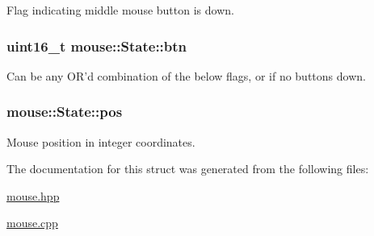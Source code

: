 Flag indicating middle mouse button is down. 

\hypertarget{structmouse_1_1_state_a27fa449d068a08894434d44c160f0f00}{
\subsubsection[{btn}]{\setlength{\rightskip}{0pt plus 5cm}uint16\-\_\-t {\bf mouse\-::\-State\-::btn}}}\label{structmouse_1_1_state_a27fa449d068a08894434d44c160f0f00}


Can be any {\ttfamily O\-R}'d combination of the below flags, or {} if no buttons down. 

\hypertarget{structmouse_1_1_state_ae4c6bba70a3c69992f7624bfc908b2c0}{
\subsubsection[{pos}]{ {\bf mouse\-::\-State\-::pos}}}\label{structmouse_1_1_state_ae4c6bba70a3c69992f7624bfc908b2c0}


Mouse position in integer coordinates. 



The documentation for this struct was generated from the following files\-:\begin{DoxyCompactItemize}
\item 
\hyperlink{mouse_8hpp}{mouse.\-hpp}\item 
\hyperlink{mouse_8cpp}{mouse.\-cpp}\end{DoxyCompactItemize}
